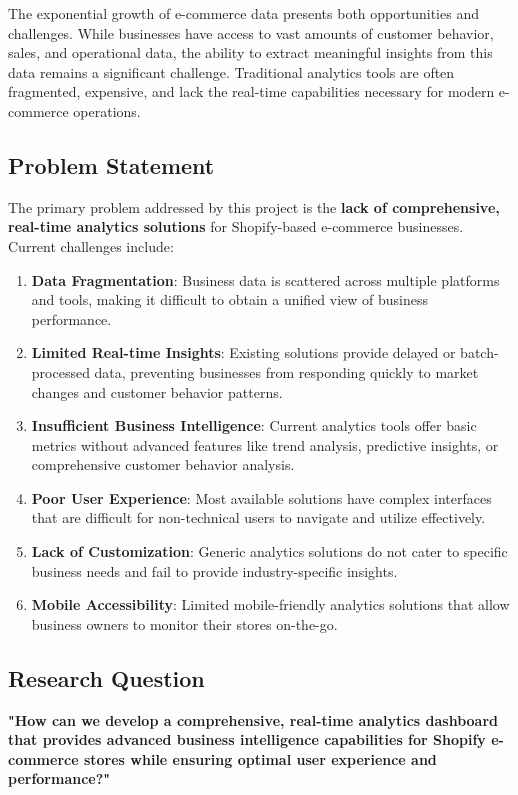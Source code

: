 \documentclass[12pt]{article}
\begin{document}
The exponential growth of e-commerce data presents both opportunities and challenges. While businesses have access to vast amounts of customer behavior, sales, and operational data, the ability to extract meaningful insights from this data remains a significant challenge. Traditional analytics tools are often fragmented, expensive, and lack the real-time capabilities necessary for modern e-commerce operations.

\subsection{Problem Statement}
The primary problem addressed by this project is the \textbf{lack of comprehensive, real-time analytics solutions} for Shopify-based e-commerce businesses. Current challenges include:

\begin{enumerate}[label=(\alph*)]
    \item \textbf{Data Fragmentation}: Business data is scattered across multiple platforms and tools, making it difficult to obtain a unified view of business performance.
    
    \item \textbf{Limited Real-time Insights}: Existing solutions provide delayed or batch-processed data, preventing businesses from responding quickly to market changes and customer behavior patterns.
    
    \item \textbf{Insufficient Business Intelligence}: Current analytics tools offer basic metrics without advanced features like trend analysis, predictive insights, or comprehensive customer behavior analysis.
    
    \item \textbf{Poor User Experience}: Most available solutions have complex interfaces that are difficult for non-technical users to navigate and utilize effectively.
    
    \item \textbf{Lack of Customization}: Generic analytics solutions do not cater to specific business needs and fail to provide industry-specific insights.
    
    \item \textbf{Mobile Accessibility}: Limited mobile-friendly analytics solutions that allow business owners to monitor their stores on-the-go.
\end{enumerate}

\subsection{Research Question}
\textbf{"How can we develop a comprehensive, real-time analytics dashboard that provides advanced business intelligence capabilities for Shopify e-commerce stores while ensuring optimal user experience and performance?"}
\end{document}
